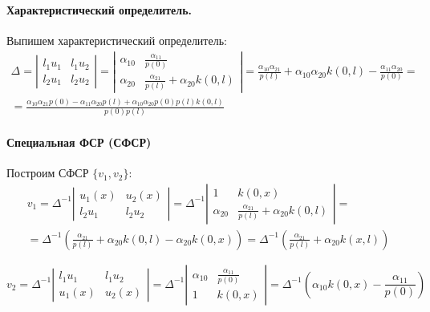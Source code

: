\documentclass[a4paper,12pt]{article} %
\begin{document}
\paragraph{Характеристический определитель.}

Выпишем характеристический определитель:
\begin{multline}
	\Delta
	=
	\left|\begin{array}{cc}
		l_1 u_1 & l_1 u_2 \\
		l_2 u_1 & l_2 u_2
	\end{array}\right|
	=
	\left|\begin{array}{cc}
		\alpha_{10} & \frac{\alpha_{11}}{p(0)} \\
		\alpha_{20} & \frac{\alpha_{21}}{p(l)} +\alpha_{20} k(0,l)
	\end{array}\right|
	=
	\frac{\alpha_{10}\alpha_{21}}{p(l)} + \alpha_{10}\alpha_{20} k(0,l) - \frac{\alpha_{11}\alpha_{20}}{p(0)}
	=
	\\=
	\frac{\alpha_{10}\alpha_{21}p(0)  - \alpha_{11}\alpha_{20}p(l) + \alpha_{10}\alpha_{20} p(0) p(l) k(0,l)}{p(0)p(l)}
\end{multline}

\paragraph{Специальная ФСР (СФСР)}
Построим СФСР $\{v_1, v_2\}$:
\begin{multline}
	v_1 =
	\Delta^{-1}
	\left|\begin{array}{cc}
		u_1(x) & u_2(x) \\
		l_2 u_1 & l_2 u_2
	\end{array}\right|
	=
	\Delta^{-1}
	\left|\begin{array}{cc}
		1 & k(0,x) \\
		\alpha_{20} & \frac{\alpha_{21}}{p(l)} +\alpha_{20} k(0,l)
	\end{array}\right|
	=
	\\=
	\Delta^{-1}
	\left(
		\frac{\alpha_{21}}{p(l)} +\alpha_{20} k(0,l) - \alpha_{20} k(0,x)
	\right)
	=
	\Delta^{-1}
	\left(
		\frac{\alpha_{21}}{p(l)} +\alpha_{20} k(x,l)
	\right)
\end{multline}

\begin{equation}
	v_2 =
	\Delta^{-1}
	\left|\begin{array}{cc}
		l_1 u_1 & l_1 u_2 \\
		u_1(x) & u_2(x)
	\end{array}\right|
	=
	\Delta^{-1}
	\left|\begin{array}{cc}
		\alpha_{10} & \frac{\alpha_{11}}{p(0)} \\
		1       & k(0, x)
	\end{array}\right|
	=
	\Delta^{-1}
	\left(
		\alpha_{10} k(0, x) - \frac{\alpha_{11}}{p(0)}
	\right)
\end{equation}
\end{document}
